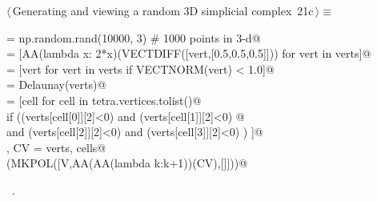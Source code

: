 \documentclass[11pt,oneside]{article}	%
\begin{document}
\begin{flushleft} \small
\begin{minipage}{\linewidth} \label{scrap48}
\protect{}$\langle\,$Generating and viewing a random 3D simplicial complex\nobreak\ {\footnotesize 21c}$\,\rangle\equiv$
\vspace{-1ex}
\begin{list}{}{} \item
\mbox{}\verb@verts = np.random.rand(10000, 3) # 1000 points in 3-d@\\
\mbox{}\verb@verts = [AA(lambda x: 2*x)(VECTDIFF([vert,[0.5,0.5,0.5]])) for vert in verts]@\\
\mbox{}\verb@verts = [vert for vert in verts if VECTNORM(vert) < 1.0]@\\
\mbox{}\verb@tetra = Delaunay(verts)@\\
\mbox{}\verb@cells = [cell for cell in tetra.vertices.tolist()@\\
\mbox{}\verb@         if  ((verts[cell[0]][2]<0) and (verts[cell[1]][2]<0) @\\
\mbox{}\verb@               and (verts[cell[2]][2]<0) and (verts[cell[3]][2]<0) ) ]@\\
\mbox{}\verb@V, CV = verts, cells@\\
\mbox{}\verb@VIEW(MKPOL([V,AA(AA(lambda k:k+1))(CV),[]]))@\\
\mbox{}\verb@@{\NWsep}
\end{list}
\vspace{-1ex}
\footnotesize\addtolength{\baselineskip}{-1ex}
\begin{list}{}{\setlength{\itemsep}{-\parsep}\setlength{\itemindent}{-\leftmargin}}
\item \NWtxtMacroRefIn\ .
\end{list}
\end{minipage}\\[4ex]
\end{flushleft}
\end{document}
